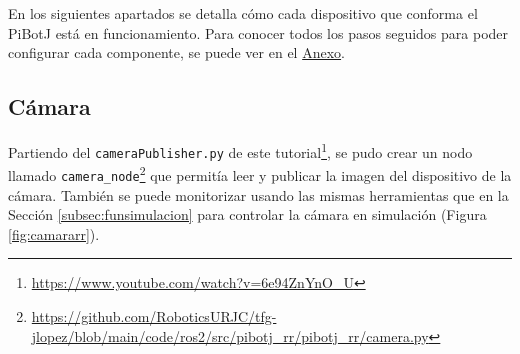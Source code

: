 
En los siguientes apartados se detalla cómo cada dispositivo que conforma el PiBotJ está en funcionamiento. Para conocer todos los pasos seguidos para poder configurar cada componente, se puede ver en el \hyperref[cap:capitulo9]{Anexo}.  


\subsection{Cámara}
\label{subsec:configcamara}




 



Partiendo del \verb|cameraPublisher.py| de este tutorial\footnote{\url{https://www.youtube.com/watch?v=6e94ZnYnO_U}}, se pudo crear un nodo llamado \verb|camera_node|\footnote{\url{https://github.com/RoboticsURJC/tfg-jlopez/blob/main/code/ros2/src/pibotj_rr/pibotj_rr/camera.py}} que permitía leer y publicar la imagen del dispositivo de la cámara. También se puede monitorizar usando las mismas herramientas que en la Sección \ref{subsec:funsimulacion} para controlar la cámara en simulación (Figura \ref{fig:camararr}).


